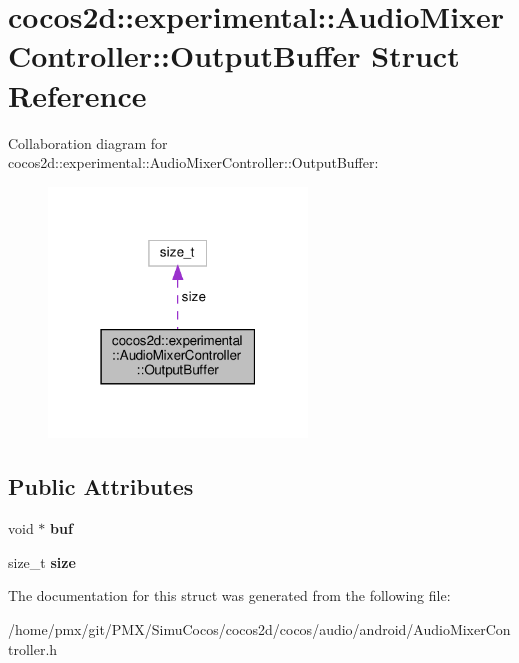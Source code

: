 \hypertarget{structcocos2d_1_1experimental_1_1AudioMixerController_1_1OutputBuffer}{}\section{cocos2d\+:\+:experimental\+:\+:Audio\+Mixer\+Controller\+:\+:Output\+Buffer Struct Reference}
\label{structcocos2d_1_1experimental_1_1AudioMixerController_1_1OutputBuffer}


Collaboration diagram for cocos2d\+:\+:experimental\+:\+:Audio\+Mixer\+Controller\+:\+:Output\+Buffer\+:
\nopagebreak
\begin{figure}[H]
\begin{center}
\leavevmode
\includegraphics[width=195pt]{structcocos2d_1_1experimental_1_1AudioMixerController_1_1OutputBuffer__coll__graph}
\end{center}
\end{figure}
\subsection*{Public Attributes}
\begin{DoxyCompactItemize}
\item 
\mbox{\label{structcocos2d_1_1experimental_1_1AudioMixerController_1_1OutputBuffer_a346cdad315a5f6487de161cb4fcade3c}} 
void $\ast$ {\bfseries buf}
\item 
\mbox{\label{structcocos2d_1_1experimental_1_1AudioMixerController_1_1OutputBuffer_a9bdb745164dd4e92dc0b26ea812c2afd}} 
size\+\_\+t {\bfseries size}
\end{DoxyCompactItemize}


The documentation for this struct was generated from the following file\+:\begin{DoxyCompactItemize}
\item 
/home/pmx/git/\+P\+M\+X/\+Simu\+Cocos/cocos2d/cocos/audio/android/Audio\+Mixer\+Controller.\+h\end{DoxyCompactItemize}
